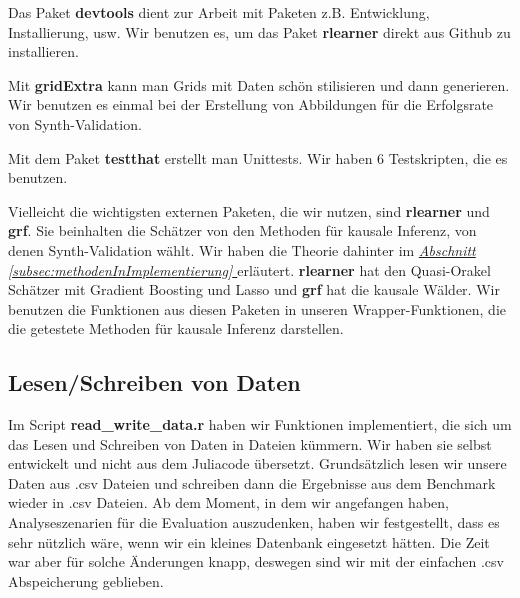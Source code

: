 \documentclass[12pt,a4paper,twoside]{scrartcl}
\numberwithin{equation}{section}
\newcommand{\refsec}[1]{\emph{\hyperref[#1]{Abschnitt \ref*{#1} }}}
\begin{document}
\noindent
Das Paket \textbf{devtools} dient zur Arbeit mit Paketen z.B. Entwicklung, Installierung, usw. Wir benutzen es, um das Paket \textbf{rlearner} direkt aus Github zu installieren.\par

\noindent
Mit \textbf{gridExtra} kann man Grids mit Daten schön stilisieren und dann generieren. Wir benutzen es einmal bei der Erstellung von Abbildungen für die Erfolgsrate von Synth-Validation.\par

\noindent
Mit dem Paket \textbf{testthat} erstellt man Unittests. Wir haben 6 Testskripten, die es benutzen.\par

\noindent
Vielleicht die wichtigsten externen Paketen, die wir nutzen, sind \textbf{rlearner} und \textbf{grf}. Sie beinhalten die Schätzer von den Methoden für kausale Inferenz, von denen Synth-Validation wählt. Wir haben die Theorie dahinter im \refsec{subsec:methodenInImplementierung} erläutert. \textbf{rlearner} hat den Quasi-Orakel Schätzer mit Gradient Boosting und Lasso und  \textbf{grf} hat die kausale Wälder. Wir benutzen die Funktionen aus diesen Paketen in unseren Wrapper-Funktionen, die die getestete Methoden für kausale Inferenz darstellen.\par
\subsection{Lesen/Schreiben von Daten}\label{subsec:lesenSchreibenDaten}

\noindent
Im Script \textbf{read\_write\_data.r} haben wir Funktionen implementiert, die sich um das Lesen und Schreiben von Daten in Dateien kümmern. Wir haben sie selbst entwickelt und nicht aus dem Juliacode übersetzt. Grundsätzlich lesen wir unsere Daten aus .csv Dateien und schreiben dann die Ergebnisse aus dem Benchmark wieder in .csv Dateien. Ab dem Moment, in dem wir angefangen haben, Analyseszenarien für die Evaluation auszudenken, haben wir festgestellt, dass es sehr nützlich wäre, wenn wir ein kleines Datenbank eingesetzt hätten. Die Zeit war aber für solche Änderungen knapp, deswegen sind wir mit der einfachen .csv Abspeicherung geblieben.\par 
\end{document}
